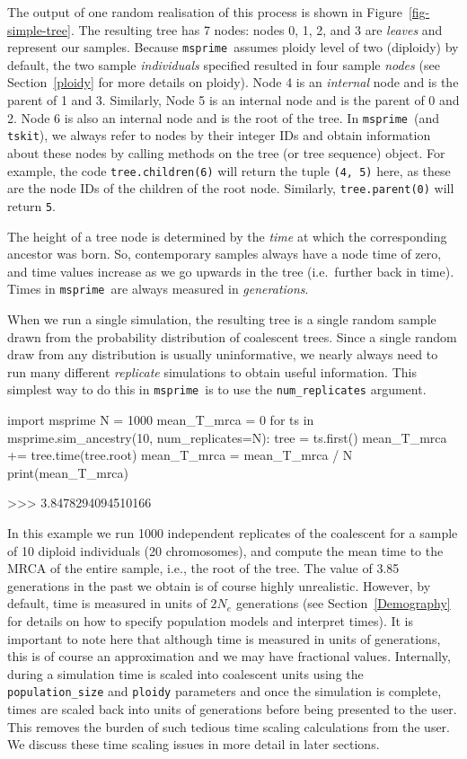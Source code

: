 \documentclass[graybox]{svmult}
\newcommand{\msprime}[0]{\texttt{msprime}}
\newcommand{\tskit}[0]{\texttt{tskit}}
\begin{document}
The output of one random realisation of this process is shown in
Figure~\ref{fig-simple-tree}. The resulting tree has 7 nodes:
nodes 0, 1, 2, and 3 are \emph{leaves} and
represent our samples.
Because \msprime\ assumes ploidy level of two (diploidy) by default,
the two sample \emph{individuals} specified resulted in four
sample \emph{nodes}
(see Section~\ref{ploidy} for more details on ploidy).
Node 4 is an \emph{internal} node and is the
parent of 1 and 3. Similarly, Node 5 is an internal node and is the
parent of 0 and 2. Node 6 is also an internal node and is the root of
the tree. In \msprime\ (and \tskit), we always refer to nodes by their integer IDs and
obtain information about these nodes by calling methods on the tree
(or tree sequence) object. For example, the code \texttt{tree.children(6)} will return the
tuple \texttt{(4,\ 5)} here, as these are the node IDs of the children
of the root node. Similarly, \texttt{tree.parent(0)} will return
\texttt{5}.

The height of a tree node is determined by the \emph{time} at which the corresponding
ancestor was born. So,
contemporary samples always have a node time of zero, and time values
increase as we go upwards in the tree (i.e.\ further back in time). Times
in \msprime\ are always measured in \emph{generations}.

When we run a single simulation, the resulting tree is a single random
sample drawn from the probability distribution of coalescent trees. Since a
single random draw from any distribution is usually uninformative, we
nearly always need to run many different \emph{replicate} simulations to
obtain useful information. This simplest way to do this in \msprime\ is to
use the \texttt{num\_replicates} argument.

\begin{pythoncode}
import msprime
N = 1000
mean_T_mrca = 0
for ts in msprime.sim_ancestry(10, num_replicates=N):
    tree = ts.first()
    mean_T_mrca += tree.time(tree.root)
mean_T_mrca = mean_T_mrca / N
print(mean_T_mrca)

>>> 3.8478294094510166
\end{pythoncode}

In this example we run 1000 independent replicates of the coalescent for
a sample of 10 diploid individuals (20 chromosomes),
and compute the mean time to the MRCA of the entire sample, i.e., the root of the
tree. The value of 3.85 generations in the past we obtain is of course highly unrealistic.
However, by default, time is measured in units of \(2 N_e\) generations (see Section~\ref{Demography}
for details on how to specify population models and interpret times). It is important to note here
that although time is measured in units of generations, this is of course
an approximation and we may have fractional values. Internally,
during a simulation time is scaled into coalescent units
using the \texttt{population\_size} and \texttt{ploidy} parameters and once the
simulation is complete, times are scaled back into units of generations
before being presented to the user. This removes the burden of such
tedious time scaling calculations from the user. We discuss these time
scaling issues in more detail in later sections.
\end{document}
